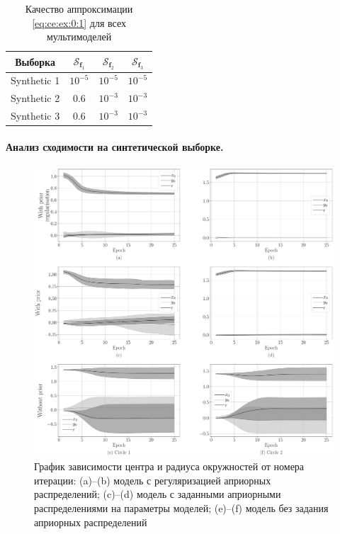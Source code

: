 \begin{table}[h!t]
\begin{center}
\caption{Качество аппроксимации \eqref{eq:ce:ex:0:1} для всех мультимоделей}
\label{tb:ce:1}
\begin{tabular}{|c|c|c|c|}
\hline
	Выборка & $\mathcal{S}_{\textbf{f}_1}$ & $\mathcal{S}_{\textbf{f}_2} $& $\mathcal{S}_{\textbf{f}_3} $\\
	\hline
	\multicolumn{1}{|l|}{Synthetic 1}
	& $10^{-5}$& $10^{-5}$& $10^{-5}$\\
	\hline
	\multicolumn{1}{|l|}{Synthetic 2}
	& $0.6$& $10^{-3}$& $10^{-3}$\\
	\hline
	\multicolumn{1}{|l|}{Synthetic 3}
	& $0.6$& $10^{-3}$& $10^{-3}$\\
\hline
\end{tabular}
\end{center}
\end{table}

\paragraph{Анализ сходимости на синтетической выборке.}
\begin{figure}[h!t]\center
\includegraphics[width=1\textwidth]{results/priorexpert/experiment_synthetic_param_progress}
\caption{График зависимости центра и радиуса окружностей от номера итерации: (a)--(b) модель с регуляризацией априорных распределений; (c)--(d) модель с заданными априорными распределениями на параметры моделей; (e)--(f) модель без задания априорных распределений}
\label{experiment:st:2:1}
\end{figure}

